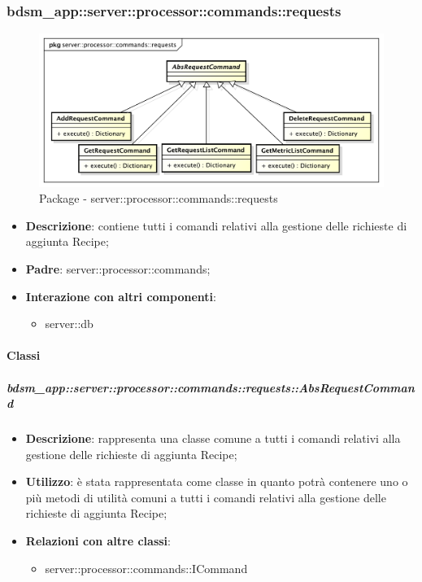       \subsubsection{bdsm\_app::server::processor::commands::requests} %
      \label{ssub:bdsm_app_server_processor_commands_requests}
      \begin{figure}[!htbp]
      	\centering
      	\centerline{\includegraphics[scale=0.5]{./images/server/requests.pdf}}
      	\caption{Package - server::processor::commands::requests}
      \end{figure}

      \begin{itemize}
        \item \textbf{Descrizione}: contiene tutti i comandi relativi alla gestione delle richieste di aggiunta Recipe;
        \item \textbf{Padre}: server::processor::commands;
        \item \textbf{Interazione con altri componenti}:
          \begin{itemize}
            \item server::db
          \end{itemize}
      \end{itemize}

        \paragraph{Classi} %

        \subparagraph{bdsm\_app::server::processor::commands::requests::AbsRequestCommand} %
        \label{subp:bdsm_app_server_processor_commands_requests_absrequestcommand}
        \begin{itemize}
          \item \textbf{Descrizione}: rappresenta una classe comune a tutti i comandi relativi alla gestione delle richieste di aggiunta Recipe;
          \item \textbf{Utilizzo}: è stata rappresentata come classe in quanto potrà contenere uno o più metodi di utilità comuni a tutti i comandi relativi alla gestione delle richieste di aggiunta Recipe;
          \item \textbf{Relazioni con altre classi}:
            \begin{itemize}
              \item server::processor::commands::ICommand
            \end{itemize}
        \end{itemize}

